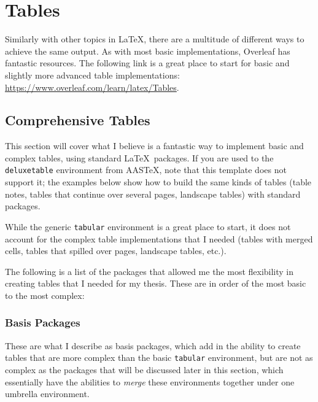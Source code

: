 \chapter{Tables}
\label{ch:tables}

Similarly with other topics in \LaTeX, there are a multitude of different ways to achieve the same output. As with most basic implementations, Overleaf has fantastic resources. The following link is a great place to start for basic and slightly more advanced table implementations: \url{https://www.overleaf.com/learn/latex/Tables}.

\section{Comprehensive Tables}
\label{sec:tables-comprehensive}

This section will cover what I believe is a fantastic way to implement basic and complex tables, using standard \LaTeX\ packages. If you are used to the \texttt{deluxetable} environment from AASTeX, note that this template does not support it; the examples below show how to build the same kinds of tables (table notes, tables that continue over several pages, landscape tables) with standard packages.

While the generic \texttt{tabular} environment is a great place to start, it does not account for the complex table implementations that I needed (tables with merged cells, tables that spilled over pages, landscape tables, etc.).

The following is a list of the packages that allowed me the most flexibility in creating tables that I needed for my thesis. These are in order of the most basic to the most complex:

\subsection{Basis Packages}
\label{sec:tables-basis-packages}

These are what I describe as basis packages, which add in the ability to create tables that are more complex than the basic \texttt{tabular} environment, but are not as complex as the packages that will be discussed later in this section, which essentially have the abilities to \emph{merge} these environments together under one umbrella environment.


